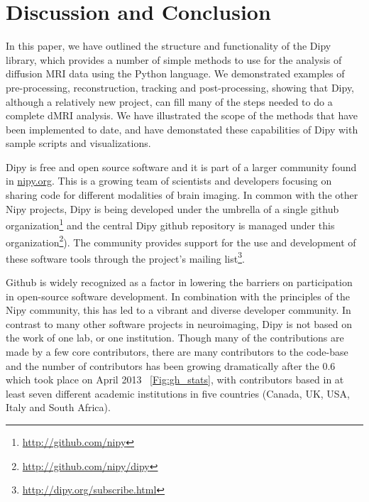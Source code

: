 \documentclass{bioinfo}
\begin{document}
\section{Discussion and Conclusion}

In this paper, we have outlined the structure and functionality of the Dipy library,
which provides a number of simple methods to use for the analysis of diffusion MRI data using the Python
language. We demonstrated examples of pre-processing, reconstruction, tracking and post-processing,
showing that Dipy, although a relatively new project, can fill many of the steps needed to do a complete
dMRI analysis. We have illustrated the scope of the methods that have been implemented to date, and have
demonstated these capabilities of Dipy with sample scripts and visualizations.

Dipy is free and open source software and it is part of a larger community found in \url{nipy.org}.
This is a growing team of scientists and developers focusing on sharing code for different modalities
of brain imaging. In common with the other Nipy projects, Dipy is being developed under the
umbrella of a single github organization\footnote{\url{http://github.com/nipy}} and the central
Dipy github repository is managed under this organization\footnote{\url{http://github.com/nipy/dipy}}).
The community provides support for the use and development of these software tools through
the project's mailing list\footnote{\url{http://dipy.org/subscribe.html}}.

Github is widely recognized as a factor in lowering the barriers on
participation in open-source software development. In combination with
the principles of the Nipy community, this has led to a vibrant and diverse
developer community. In contrast to many other software projects in
neuroimaging, Dipy is not based on the work of one lab, or one institution. Though
many of the contributions are made by a few core contributors, there are many
contributors to the code-base and the number of contributors has been growing
dramatically after the 0.6 which took place on April 2013 ~\ref{Fig:gh_stats},
with contributors based in at least seven different academic
institutions in five countries (Canada, UK, USA, Italy and South Africa).
\end{document}
